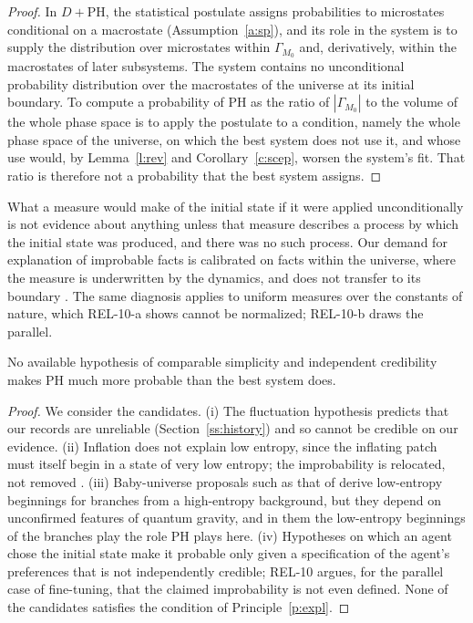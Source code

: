 \documentclass{situationist-preprint}
\begin{document}
\begin{proof}
In $D+\mathrm{PH}$, the statistical postulate assigns probabilities to microstates conditional on a macrostate (Assumption~\ref{a:sp}), and its role in the system is to supply the distribution over microstates within $\Gamma_{M_0}$ and, derivatively, within the macrostates of later subsystems. The system contains no unconditional probability distribution over the macrostates of the universe at its initial boundary. To compute a probability of PH as the ratio of $|\Gamma_{M_0}|$ to the volume of the whole phase space is to apply the postulate to a condition, namely the whole phase space of the universe, on which the best system does not use it, and whose use would, by Lemma~\ref{l:rev} and Corollary~\ref{c:scep}, worsen the system's fit. That ratio is therefore not a probability that the best system assigns.
\end{proof}

What a measure would make of the initial state if it were applied unconditionally is not evidence about anything unless that measure describes a process by which the initial state was produced, and there was no such process. Our demand for explanation of improbable facts is calibrated on facts within the universe, where the measure is underwritten by the dynamics, and does not transfer to its boundary \citep{Callender2004}. The same diagnosis applies to uniform measures over the constants of nature, which REL-10-a shows cannot be normalized; REL-10-b draws the parallel.

\begin{lemma}\label{l:rival}
No available hypothesis of comparable simplicity and independent credibility makes PH much more probable than the best system does.
\end{lemma}

\begin{proof}
We consider the candidates. (i) The fluctuation hypothesis predicts that our records are unreliable (Section~\ref{ss:history}) and so cannot be credible on our evidence. (ii) Inflation does not explain low entropy, since the inflating patch must itself begin in a state of very low entropy; the improbability is relocated, not removed \citep{Penrose1989,AlbrechtSorbo2004}. (iii) Baby-universe proposals such as that of \citet{CarrollChen2004} derive low-entropy beginnings for branches from a high-entropy background, but they depend on unconfirmed features of quantum gravity, and in them the low-entropy beginnings of the branches play the role PH plays here. (iv) Hypotheses on which an agent chose the initial state make it probable only given a specification of the agent's preferences that is not independently credible; REL-10 argues, for the parallel case of fine-tuning, that the claimed improbability is not even defined. None of the candidates satisfies the condition of Principle~\ref{p:expl}.
\end{proof}
\end{document}
